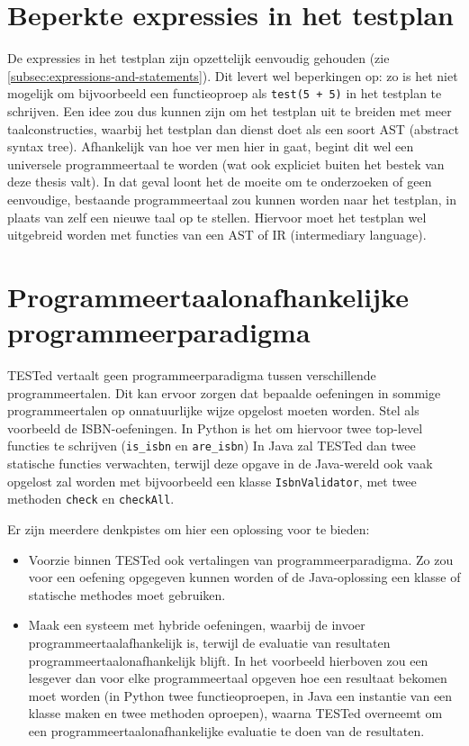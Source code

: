 \section{Beperkte expressies in het testplan}\label{sec:beperkte-expressies-in-het-testplan}

De expressies in het testplan zijn opzettelijk eenvoudig gehouden (zie \cref{subsec:expressions-and-statements}).
Dit levert wel beperkingen op: zo is het niet mogelijk om bijvoorbeeld een functieoproep als \texttt{test(5 + 5)} in het testplan te schrijven.
Een idee zou dus kunnen zijn om het testplan uit te breiden met meer taalconstructies, waarbij het testplan dan dienst doet als een soort AST (abstract syntax tree).
Afhankelijk van hoe ver men hier in gaat, begint dit wel een universele programmeertaal te worden (wat ook expliciet buiten het bestek van deze thesis valt).
In dat geval loont het de moeite om te onderzoeken of geen eenvoudige, bestaande programmeertaal  zou kunnen worden naar het testplan, in plaats van zelf een nieuwe taal op te stellen.
Hiervoor moet het testplan wel uitgebreid worden met functies van een AST of IR (intermediary language).


\section{Programmeertaalonafhankelijke programmeerparadigma}\label{sec:programmeerparadigma}

TESTed vertaalt geen programmeerparadigma tussen verschillende programmeertalen.
Dit kan ervoor zorgen dat bepaalde oefeningen in sommige programmeertalen op onnatuurlijke wijze opgelost moeten worden.
Stel als voorbeeld de ISBN-oefeningen.
In Python is het  om hiervoor twee top-level functies te schrijven (\texttt{is\_isbn} en \texttt{are\_isbn})
In Java zal TESTed dan twee statische functies verwachten, terwijl deze opgave in de Java-wereld ook vaak opgelost zal worden met bijvoorbeeld een klasse \texttt{IsbnValidator}, met twee methoden \texttt{check} en \texttt{checkAll}.

Er zijn meerdere denkpistes om hier een oplossing voor te bieden:

\begin{itemize}
    \item Voorzie binnen TESTed ook vertalingen van programmeerparadigma.
    Zo zou voor een oefening opgegeven kunnen worden of de Java-oplossing een klasse of statische methodes moet gebruiken.
    \item Maak een systeem met hybride oefeningen, waarbij de invoer programmeertaalafhankelijk is, terwijl de evaluatie van resultaten programmeertaalonafhankelijk blijft.
    In het voorbeeld hierboven zou een lesgever dan voor elke programmeertaal opgeven hoe een resultaat bekomen moet worden (in Python twee functieoproepen, in Java een instantie van een klasse maken en twee methoden oproepen), waarna TESTed overneemt om een programmeertaalonafhankelijke evaluatie te doen van de resultaten.
\end{itemize}

